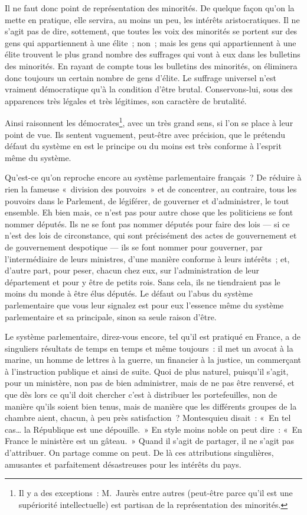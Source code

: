 \documentclass[french,twoside]{book} %
\begin{document}
Il ne faut donc point de représentation des minorités. De quelque façon qu’on la mette en pratique, elle servira, au moins un peu, les intérêts aristocratiques. Il ne s’agit pas de dire, sottement, que toutes les voix des minorités se portent sur des gens qui appartiennent à une élite ; non ; mais les gens qui appartiennent à une élite trouvent le plus grand nombre des suffrages qui vont à eux dans les bulletins des minorités. En rayant de compte tous les bulletins des minorités, on éliminera donc toujours un certain nombre de gens d’élite. Le suffrage universel n’est vraiment démocratique qu’à la condition d’être brutal. Conservons-lui, sous des apparences très légales et très légitimes, son caractère de brutalité.\par
Ainsi raisonnent les démocrates\footnote{Il y a des exceptions : M. Jaurès entre autres (peut-être parce qu’il est une supériorité intellectuelle) est partisan de la représentation des minorités.}, avec un très  grand sens, si l’on se place à leur point de vue. Ils sentent vaguement, peut-être avec précision, que le prétendu défaut du système en est le principe ou du moins est très conforme à l’esprit même du système.\par
Qu’est-ce qu’on reproche encore au système parlementaire français ? De réduire à rien la fameuse « division des pouvoirs » et de concentrer, au contraire, tous les pouvoirs dans le Parlement, de légiférer, de gouverner et d’administrer, le tout ensemble. Eh bien mais, ce n’est pas pour autre chose que les politiciens se font nommer députés. Ils ne se font pas nommer députés pour faire des lois — si ce n’est des lois de circonstance, qui sont précisément des actes de gouvernement et de gouvernement despotique — ils se font nommer pour gouverner, par l’intermédiaire de leurs ministres, d’une manière conforme à leurs intérêts ; et, d’autre part, pour peser, chacun chez eux, sur l’administration de leur département et pour y être de petits rois. Sans cela, ils ne tiendraient pas le moins du monde à être élus députés. Le défaut ou l’abus du système parlementaire que vous leur signalez est pour eux l’essence même du système parlementaire et sa principale, sinon sa seule raison d’être.\par
 Le système parlementaire, direz-vous encore, tel qu’il est pratiqué en France, a de singuliers résultats de temps en temps et même toujours : il met un avocat à la marine, un homme de lettres à la guerre, un financier à la justice, un commerçant à l’instruction publique et ainsi de suite. Quoi de plus naturel, puisqu’il s’agit, pour un ministère, non pas de bien administrer, mais de ne pas être renversé, et que dès lors ce qu’il doit chercher c’est à distribuer les portefeuilles, non de manière qu’ils soient bien tenus, mais de manière que les différents groupes de la chambre aient, chacun, à peu près satisfaction ? Montesquieu disait : « En tel cas… la République est une dépouille. » En style moins noble on peut dire : « En France le ministère est un gâteau. » Quand il s’agit de partager, il ne s’agit pas d’attribuer. On partage comme on peut. De là ces attributions singulières, amusantes et parfaitement désastreuses pour les intérêts du pays.\par
\end{document}
